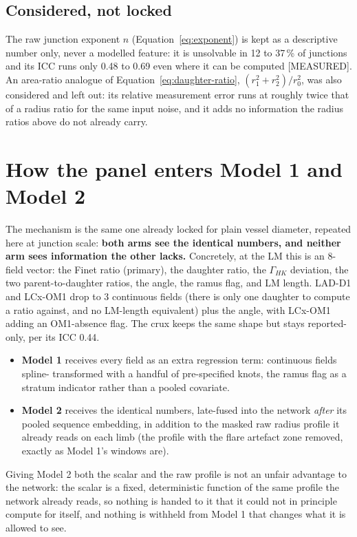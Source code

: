 \documentclass[11pt]{article}
\begin{document}
\subsection*{Considered, not locked}

The raw junction exponent $n$ (Equation~\ref{eq:exponent}) is kept as a descriptive number only,
never a modelled feature: it is unsolvable in 12 to 37\,\% of junctions and its ICC runs only 0.48 to
0.69 even where it can be computed [MEASURED]. An area-ratio analogue of Equation~\ref{eq:daughter-ratio},
$(r_1^2+r_2^2)/r_0^2$, was also considered and left out: its relative measurement error runs at
roughly twice that of a radius ratio for the same input noise, and it adds no information the radius
ratios above do not already carry.

\section*{How the panel enters Model 1 and Model 2}

The mechanism is the same one already locked for plain vessel diameter, repeated here at junction
scale: \textbf{both arms see the identical numbers, and neither arm sees information the other
lacks.} Concretely, at the LM this is an 8-field vector: the Finet ratio (primary), the daughter
ratio, the $\Gamma_{HK}$ deviation, the two parent-to-daughter ratios, the angle, the ramus flag, and
LM length. LAD-D1 and LCx-OM1 drop to 3 continuous fields (there is only one daughter to compute a
ratio against, and no LM-length equivalent) plus the angle, with LCx-OM1 adding an OM1-absence flag.
The crux keeps the same shape but stays reported-only, per its ICC 0.44.

\begin{itemize}
  \item \textbf{Model 1} receives every field as an extra regression term: continuous fields spline-
    transformed with a handful of pre-specified knots, the ramus flag as a stratum indicator rather
    than a pooled covariate.
  \item \textbf{Model 2} receives the identical numbers, late-fused into the network \emph{after} its
    pooled sequence embedding, in addition to the masked raw radius profile it already reads on each
    limb (the profile with the flare artefact zone removed, exactly as Model 1's windows are).
\end{itemize}
Giving Model 2 both the scalar and the raw profile is not an unfair advantage to the network: the
scalar is a fixed, deterministic function of the same profile the network already reads, so nothing
is handed to it that it could not in principle compute for itself, and nothing is withheld from
Model 1 that changes what it is allowed to see.
\end{document}
